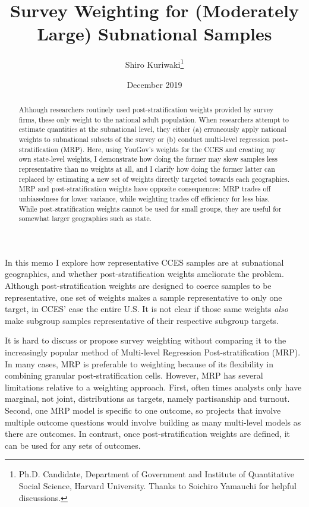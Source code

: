 \documentclass[11pt]{article}
\title{\large\textbf{Survey Weighting for (Moderately Large) Subnational Samples}}
\author{\normalsize  Shiro Kuriwaki\thanks{Ph.D. Candidate, Department of Government and Institute of Quantitative Social Science, Harvard University. Thanks to Soichiro Yamauchi for helpful discussions.}}
\date{\normalsize December 2019}
\begin{document}



\newpage

\maketitle

\begin{abstract}
\noindent Although researchers routinely used post-stratification weights provided by survey firms, these only weight to the national adult population. When researchers attempt to estimate quantities at the subnational level, they either (a) erroneously apply national weights to subnational subsets of the survey or (b) conduct multi-level regression post-stratification (MRP). Here, using YouGov's weights for the CCES and creating my own state-level weights, I demonstrate how doing the former may skew samples less representative than no weights at all, and I clarify how doing the former latter can replaced by estimating a new set of weights directly targeted towards each geographies. MRP and post-stratification weights have opposite consequences:  MRP trades off unbiasedness for lower variance, while weighting trades off efficiency for less bias.  While post-stratification weights cannot be used for small groups, they are useful for somewhat larger geographies such as state. 
\end{abstract}

\newpage

\onehalfspacing

In this memo I explore how representative CCES samples are at subnational geographies, and whether post-stratification weights ameliorate the problem. Although post-stratification weights are designed to coerce samples to be representative, one set of weights makes a sample representative to only one target, in CCES' case the entire U.S. It is not clear if those same weights \emph{also} make subgroup samples representative of their respective subgroup targets. 

It is hard to discuss or propose survey weighting without comparing it to the increasingly popular method of Multi-level Regression Post-stratification (MRP).  In many cases, MRP is preferable to weighting because of its flexibility in combining granular post-stratification cells. However, MRP has several limitations relative to a weighting approach. First, often times analysts only have marginal, not joint, distributions as targets, namely partisanship and turnout. Second, one MRP model is specific to one outcome, so projects that involve multiple outcome questions would involve building as many multi-level models as there are outcomes. In contrast, once post-stratification weights are defined, it can be used for any sets of outcomes. 
\end{document}

